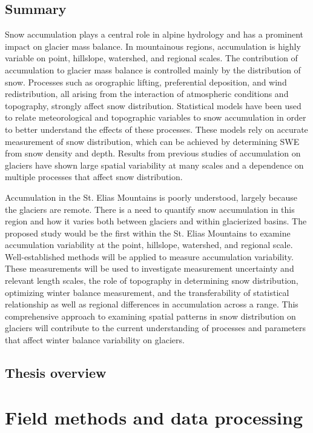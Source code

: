 \documentclass{sfuthesis}
\begin{document}
\section{Summary}
Snow accumulation plays a central role in alpine hydrology and has a prominent impact on glacier mass balance. In mountainous regions, accumulation is highly variable on point, hillslope, watershed, and regional scales. The contribution of accumulation to glacier mass balance is controlled mainly by the distribution of snow. Processes such as orographic lifting, preferential deposition, and wind redistribution, all arising from the interaction of atmospheric conditions and topography, strongly affect snow distribution. Statistical models have been used to relate meteorological and topographic variables to snow accumulation in order to better understand the effects of these processes. These models rely on accurate measurement of snow distribution, which can be achieved by determining SWE from snow density and depth. Results from previous studies of accumulation on glaciers have shown large spatial variability at many scales and a dependence on multiple processes that affect snow distribution. 

Accumulation in the St. Elias Mountains is poorly understood, largely because the glaciers are remote. There is a need to quantify snow accumulation in this region and how it varies both between glaciers and within glacierized basins. The proposed study would be the first within the St. Elias Mountains to examine accumulation variability at the point, hillslope, watershed, and regional scale. Well-established methods will be applied to measure accumulation variability.  These measurements will be used to investigate measurement uncertainty and relevant length scales, the role of topography in determining snow distribution, optimizing winter balance measurement, and the transferability of statistical relationship as well as regional differences in accumulation across a range. This comprehensive approach to examining spatial patterns in snow distribution on glaciers will contribute to the current understanding of processes and parameters that affect winter balance variability on glaciers. 

\section{Thesis overview}


\chapter{Field methods and data processing}
\end{document}
